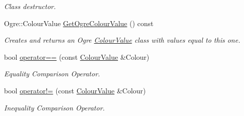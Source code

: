 \begin{DoxyCompactItemize}
\begin{DoxyCompactList}\small\item\em Class destructor. \item\end{DoxyCompactList}\item 
Ogre::ColourValue \hyperlink{classphys_1_1ColourValue_a025ed32506fe3df9e360dc00f3fb4898}{GetOgreColourValue} () const 
\begin{DoxyCompactList}\small\item\em Creates and returns an Ogre \hyperlink{classphys_1_1ColourValue}{ColourValue} class with values equal to this one. \item\end{DoxyCompactList}\item 
bool \hyperlink{classphys_1_1ColourValue_a4615835cadb51c814ef87377ac2fbc8c}{operator==} (const \hyperlink{classphys_1_1ColourValue}{ColourValue} \&Colour)
\begin{DoxyCompactList}\small\item\em Equality Comparison Operator. \item\end{DoxyCompactList}\item 
bool \hyperlink{classphys_1_1ColourValue_a06b52ce51b723ea733f2b067b03530a5}{operator!=} (const \hyperlink{classphys_1_1ColourValue}{ColourValue} \&Colour)
\begin{DoxyCompactList}\small\item\em Inequality Comparison Operator. \item\end{DoxyCompactList}\end{DoxyCompactItemize}
